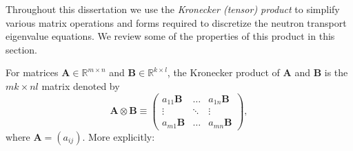 Throughout this dissertation we use the \textit{Kronecker (tensor) product} to simplify various matrix operations and forms required to discretize the neutron transport eigenvalue equations. We review some of the properties \cite{horn_topics_1994} of this product in this section. 

For matrices $\mathbf{A} \in \mathbb{R}^{m \times n}$ and $\mathbf{B} \in \mathbb{R}^{k \times l}$, the Kronecker product of $\mathbf{A}$ and $\mathbf{B}$ is the $mk \times nl$ matrix denoted by
\begin{equation}
	\mathbf{A} \otimes \mathbf{B} \equiv \begin{pmatrix}
					a_{11}\mathbf{B} & \dots & a_{1n}\mathbf{B} \\
					\vdots & \ddots & \vdots \\
					a_{m1}\mathbf{B} & \dots & a_{mn}\mathbf{B}
				    \end{pmatrix},
\end{equation}
where $\mathbf{A} = (a_{ij})$. More explicitly:

